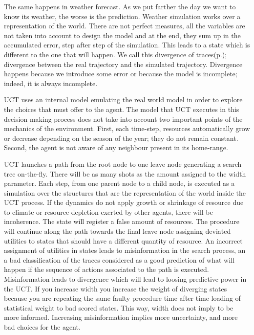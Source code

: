 \documentclass[11pt,oneside,a4paper,openright]{report}
\begin{document}
The same happens in weather forecast. As we put farther the day we want to know its weather, the worse is
the prediction. Weather simulation works over a representation of the world. There are not perfect measures,
all the variables are not taken into account to design the model and at the end, they sum up in the 
accumulated error, step after step of the simulation. This leads to a state which is different to the one 
that will happen. We call this divergence of traces(p.\pageref{sec:Divergence}); divergence between the real trajectory and the simulated trajectory. Divergence happens because we introduce some error or because the model is incomplete; indeed, it is always incomplete.  
  

UCT uses an internal model emulating the real world model in order to explore the choices that must offer 
to the agent. The model that UCT executes in this decision making process does not take into account two 
important points of the mechanics of the environment. First, each time-step, resources automatically grow or 
decrease depending on the season of the year; they do not remain constant. Second, the agent is not aware of 
any neighbour present in its home-range. 

UCT launches a path from the root node to one leave node generating a search tree on-the-fly. There will be 
as many shots as the amount assigned to the width parameter. Each step, from one parent node to a child node, 
is executed as a simulation over the structures that are the representation of the world inside the 
UCT process. If the dynamics do not apply growth or shrinkage of resource due to climate or resource depletion 
exerted by other agents, there will be incoherence. The state will register a false amount of resources.
The procedure will continue along the path towards the final leave node assigning deviated utilities to 
states that should have a different quantity of resource. An incorrect assignment of utilities in states
leads to misinformation in the search process, an a bad classification of the traces considered as a good
prediction of what will happen if the sequence of actions associated to the path is executed. Misinformation 
leads to divergence which will lead to loosing predictive power in the UCT. If you increase width you increase
the weight of diverging states because you are repeating the same faulty procedure time after time loading of
statistical weight to bad scored states. This way, width does not imply to be more informed. Increasing 
misinformation implies more uncertainty, and more bad choices for the agent.
\end{document}
